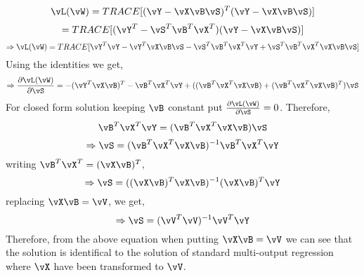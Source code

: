 \documentclass[a4paper,11pt]{article}
\begin{document}
\begin{mlsolution}

  \begin{equation}
    \vL(\vW) = TRACE[(\vY - \vX\vB\vS)^{T}(\vY - \vX\vB\vS)]
  \end{equation}
  \begin{equation}
     = TRACE[(\vY^{T} - \vS^{T}\vB^{T}\vX^{T})(\vY - \vX\vB\vS)]
  \end{equation}
  \begin{equation}
    \Rightarrow \vL(\vW) = TRACE[\vY^{T}\vY - \vY^{T}\vX\vB\vS - \vS^{T}\vB^{T}\vX^{T}\vY + \vS^{T}\vB^{T}\vX^{T}\vX\vB\vS]
  \end{equation}
  Using the identities we get,
  \begin{equation}
    \Rightarrow \frac{\partial\vL(\vW)}{\partial\vS} = -(\vY^{T}\vX\vB)^{T} - \vB^{T}\vX^{T}\vY + ((\vB^{T}\vX^{T}\vX\vB) + (\vB^{T}\vX^{T}\vX\vB)^{T})\vS
  \end{equation}
  For closed form solution keeping $\vB$ constant put $\frac{\partial\vL(\vW)}{\partial\vS} = 0$. Therefore,
  \begin{equation}
    \vB^{T}\vX^{T}\vY = (\vB^{T}\vX^{T}\vX\vB)\vS
  \end{equation}
  \begin{equation}
    \Rightarrow \vS = (\vB^{T}\vX^{T}\vX\vB)^{-1}\vB^{T}\vX^{T}\vY
  \end{equation}
  writing $\vB^{T}\vX^{T} = (\vX\vB)^{T}$,
  \begin{equation}
    \Rightarrow \vS = ((\vX\vB)^{T}\vX\vB)^{-1}(\vX\vB)^{T}\vY
  \end{equation}
  replacing $\vX\vB = \vV$, we get,
  \begin{equation}
    \Rightarrow \vS = (\vV^{T}\vV)^{-1}\vV^{T}\vY
  \end{equation}
  Therefore, from the above equation when putting $\vX\vB = \vV$ we can see that the solution is identifical to the solution of
standard multi-output regression where $\vX$ have been transformed to $\vV$.


\end{mlsolution}
\end{document}
